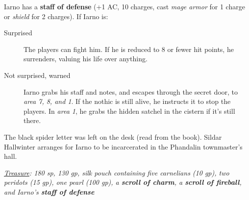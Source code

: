 Iarno has a \textbf{staff of defense} (+1 AC, 10 charges, cast \emph{mage armor} for 1 charge or \emph{shield} for 2 charges). If Iarno is:

\begin{description}
	\item[Surprised] The players can fight him. If he is reduced to 8 or fewer hit points, he surrenders, valuing his life over anything.
	\item[Not surprised, warned] Iarno grabs his staff and notes, and escapes through the secret door, to \emph{area 7, 8, and 1}. If the nothic is still alive, he instructs it to stop the players. In \emph{area 1}, he grabs the hidden satchel in the cistern if it's still there.
\end{description}

The black spider letter was left on the desk (read from the book). Sildar Hallwinter arranges for Iarno to be incarcerated in the Phandalin townmaster's hall.

\emph{\underline{Treasure}: 180 sp, 130 gp, silk pouch containing five carnelians (10 gp), two peridots (15 gp), one pearl (100 gp), a \textbf{scroll of charm}, a \textbf{scroll of fireball}, and Iarno's \textbf{staff of defense}}

